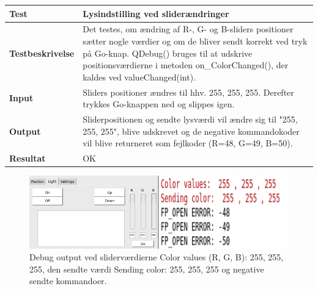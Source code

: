 \begin{table}[H]
\begin{tabular}{|l|l|}\hline
\textbf{Test} & Lysindstilling ved sliderændringer \\\hline

\textbf{Testbeskrivelse} & \multicolumn{1}{|m{11.5cm}|}{Det testes, om ændring af R-, G- og B-sliders positioner sætter nogle værdier og om de bliver sendt korrekt ved tryk på Go-knap.  QDebug() bruges til at udskrive positionsværdierne i metoden on\_ColorChanged(), der kaldes ved valueChanged(int).} \\\hline

\textbf{Input} & \multicolumn{1}{|m{11.5cm}|}{Sliders positioner ændres til hhv. 255, 255, 255. Derefter trykkes Go-knappen ned og slippes igen.} \\\hline

\textbf{Output} & \multicolumn{1}{|m{11.5cm}|}{ Sliderpositionen og sendte lysværdi vil ændre sig til "255, 255, 255", blive udskrevet og de negative kommandokoder vil blive returneret som fejlkoder (R=48, G=49, B=50).} \\\hline

\textbf{Resultat} & \multicolumn{1}{|m{11.5cm}|}{ OK} \\\hline

\end{tabular}
\end{table}

\begin{figure}[H]
\centering
\includegraphics[width=1.0\linewidth]{0_Filer/Figuer/testLight.png}
\caption{Debug output ved sliderværdierne Color values (R, G, B): 255, 255, 255, den sendte værdi Sending color: 255, 255, 255 og negative sendte kommandoer.}
\label{fig:testLight}
\end{figure}



